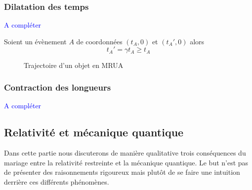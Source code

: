 \documentclass[a4paper,11pt]{report}
\theoremstyle{definition}
\theoremstyle{plain}
\theoremstyle{definition}
\theoremstyle{remark}
\newcommand{\x}{\times}
\newcommand{\comp}{\begin{center}\textcolor{blue}{A compléter}\end{center}}
\begin{document}
            
            \subsubsection{Dilatation des temps}
            \comp
            
                Soient un évènement $A$ de coordonnées $(t_A,0)$ et $(t_A',0)$ alors
                \begin{equation}
                    t_A' = \gamma t_A \geq t_A
                \end{equation}
            
                \begin{figure}[H]
                \centering
                \caption{Trajectoire d'un objet en MRUA}
                \label{fig:my_label}
                \end{figure}
            
            \subsubsection{Contraction des longueurs}
            
                \comp
            
        \subsection{Relativité et mécanique quantique}
            
            Dans cette partie nous discuterons de manière qualitative trois conséquences du mariage entre la relativité restreinte et la mécanique quantique. Le but n'est pas de présenter des raisonnements rigoureux mais plutôt de se faire une intuition derrière ces différents phénomènes.\\
            
\end{document}
